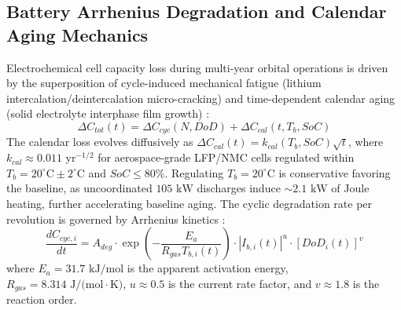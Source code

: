 \documentclass[journal]{IEEEtran}
\begin{document}
\subsection{Battery Arrhenius Degradation and Calendar Aging Mechanics}
Electrochemical cell capacity loss during multi-year orbital operations is driven by the superposition of cycle-induced mechanical fatigue (lithium intercalation/deintercalation micro-cracking) and time-dependent calendar aging (solid electrolyte interphase film growth) \cite{wang2011cycle, xu2018modeling, li2024battery}:
\begin{equation}
    \Delta C_{tot}(t) = \Delta C_{cyc}(N, DoD) + \Delta C_{cal}(t, T_{b}, SoC)
    \label{eq:total_degradation}
\end{equation}
The calendar loss evolves diffusively as $\Delta C_{cal}(t) = k_{cal}(T_b, SoC) \sqrt{t}$, where $k_{cal} \approx 0.011\text{ yr}^{-1/2}$ for aerospace-grade LFP/NMC cells regulated within $T_b = 20^\circ\text{C} \pm 2^\circ\text{C}$ and $SoC \le 80\%$. Regulating $T_b = 20^\circ\text{C}$ is conservative favoring the baseline, as uncoordinated $105\text{ kW}$ discharges induce $\sim 2.1\text{ kW}$ of Joule heating, further accelerating baseline aging. The cyclic degradation rate per revolution is governed by Arrhenius kinetics \cite{wang2011cycle}:
\begin{equation}
    \frac{d C_{cyc,i}}{dt} = A_{deg} \cdot \exp\left(-\frac{E_a}{R_{gas} T_{b,i}(t)}\right) \cdot |I_{b,i}(t)|^u \cdot [DoD_i(t)]^v
    \label{eq:arrhenius_kinetics}
\end{equation}
where $E_a = 31.7\text{ kJ/mol}$ is the apparent activation energy, $R_{gas} = 8.314\text{ J/(mol}\cdot\text{K)}$, $u \approx 0.5$ is the current rate factor, and $v \approx 1.8$ is the reaction order. 
\end{document}

